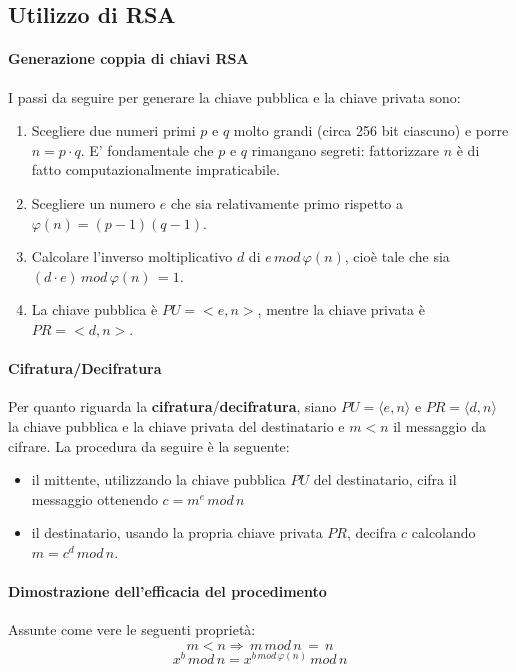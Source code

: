 \subsection{Utilizzo di RSA} \label{sec:ut_rsa}

\paragraph{Generazione coppia di chiavi RSA}
I passi da seguire per generare la chiave pubblica e la chiave privata sono: 
\begin{enumerate}
\item Scegliere due numeri primi $p$ e $q$ molto grandi (circa 256 bit ciascuno) e porre $n = p \cdot q$. E' fondamentale che $p$ e $q$ rimangano segreti: fattorizzare $n$ è di fatto computazionalmente impraticabile. 
\item Scegliere un numero $e$ che sia relativamente primo rispetto a $\varphi(n) = (p-1)(q-1)$.
\item Calcolare l'inverso moltiplicativo $d$ di $e \, mod \, \varphi(n)$, cioè tale che sia $(d \cdot e ) \, mod \, \varphi(n) \, = 1$.
\item La chiave pubblica è $PU = <e,n>$, mentre la chiave privata è $PR = <d,n>$.
\end{enumerate}

\paragraph{Cifratura/Decifratura}
Per quanto riguarda la \textbf{cifratura}/\textbf{decifratura}, siano $PU = \langle e,n \rangle$ e $PR = \langle d,n \rangle$ la chiave pubblica e la chiave privata del destinatario e $m < n$ il messaggio da cifrare. La procedura da seguire è la seguente: 
\begin{itemize}
\item il mittente, utilizzando la chiave pubblica $PU$ del destinatario, cifra il messaggio ottenendo $c = m^e \, mod \, n$
\item il destinatario, usando la propria chiave privata $PR$, decifra $c$ calcolando $m = c^d \, mod \, n$. \end{itemize}

\paragraph{Dimostrazione dell'efficacia del procedimento}
Assunte come vere le seguenti proprietà: 
\begin{equation}\label{eq:eff_1}
m<n \Rightarrow \, m \, mod \, n\,=\,n
\end{equation}
\begin{equation} \label{eq:eff_2}
	x^{b} \, mod \, n = x^{b \, mod \, \varphi(n)} \, mod \, n
\end{equation}

